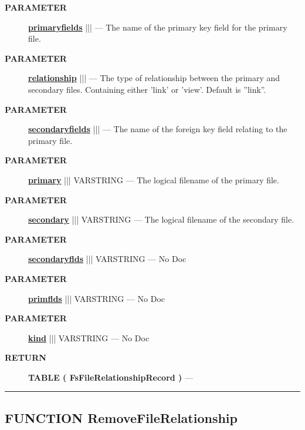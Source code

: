 \par
\begin{description}
\item [\colorbox{tagtype}{\color{white} \textbf{\textsf{PARAMETER}}}] \textbf{\underline{primaryfields}} |||  --- The name of the primary key field for the primary file.
\item [\colorbox{tagtype}{\color{white} \textbf{\textsf{PARAMETER}}}] \textbf{\underline{relationship}} |||  --- The type of relationship between the primary and secondary files. Containing either 'link' or 'view'. Default is ''link''.
\item [\colorbox{tagtype}{\color{white} \textbf{\textsf{PARAMETER}}}] \textbf{\underline{secondaryfields}} |||  --- The name of the foreign key field relating to the primary file.
\item [\colorbox{tagtype}{\color{white} \textbf{\textsf{PARAMETER}}}] \textbf{\underline{primary}} ||| VARSTRING --- The logical filename of the primary file.
\item [\colorbox{tagtype}{\color{white} \textbf{\textsf{PARAMETER}}}] \textbf{\underline{secondary}} ||| VARSTRING --- The logical filename of the secondary file.
\item [\colorbox{tagtype}{\color{white} \textbf{\textsf{PARAMETER}}}] \textbf{\underline{secondaryflds}} ||| VARSTRING --- No Doc
\item [\colorbox{tagtype}{\color{white} \textbf{\textsf{PARAMETER}}}] \textbf{\underline{primflds}} ||| VARSTRING --- No Doc
\item [\colorbox{tagtype}{\color{white} \textbf{\textsf{PARAMETER}}}] \textbf{\underline{kind}} ||| VARSTRING --- No Doc
\end{description}







\par
\begin{description}
\item [\colorbox{tagtype}{\color{white} \textbf{\textsf{RETURN}}}] \textbf{TABLE ( FsFileRelationshipRecord )} --- 
\end{description}




\rule{\linewidth}{0.5pt}
\subsection*{\textsf{\colorbox{headtoc}{\color{white} FUNCTION}
RemoveFileRelationship}}


